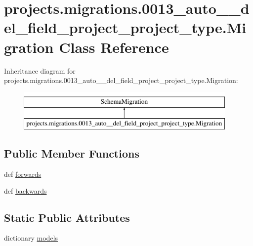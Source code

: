 \hypertarget{classprojects_1_1migrations_1_10013__auto____del__field__project__project__type_1_1_migration}{\section{projects.\-migrations.0013\-\_\-auto\-\_\-\-\_\-del\-\_\-field\-\_\-project\-\_\-project\-\_\-type.Migration Class Reference}
\label{classprojects_1_1migrations_1_10013__auto____del__field__project__project__type_1_1_migration}
}
Inheritance diagram for projects.\-migrations.0013\-\_\-auto\-\_\-\-\_\-del\-\_\-field\-\_\-project\-\_\-project\-\_\-type.Migration\-:\begin{figure}[H]
\begin{center}
\leavevmode
\includegraphics[height=2.000000cm]{classprojects_1_1migrations_1_10013__auto____del__field__project__project__type_1_1_migration}
\end{center}
\end{figure}
\subsection*{Public Member Functions}
\begin{DoxyCompactItemize}
\item 
def \hyperlink{classprojects_1_1migrations_1_10013__auto____del__field__project__project__type_1_1_migration_a8ce740add71d30298b012a6cc9941998}{forwards}
\item 
def \hyperlink{classprojects_1_1migrations_1_10013__auto____del__field__project__project__type_1_1_migration_a52a16fe200c49207f87d5e9357e8762a}{backwards}
\end{DoxyCompactItemize}
\subsection*{Static Public Attributes}
\begin{DoxyCompactItemize}
\item 
dictionary \hyperlink{classprojects_1_1migrations_1_10013__auto____del__field__project__project__type_1_1_migration_a79f66b25c2b91e23267010f67812f47d}{models}
\end{DoxyCompactItemize}


